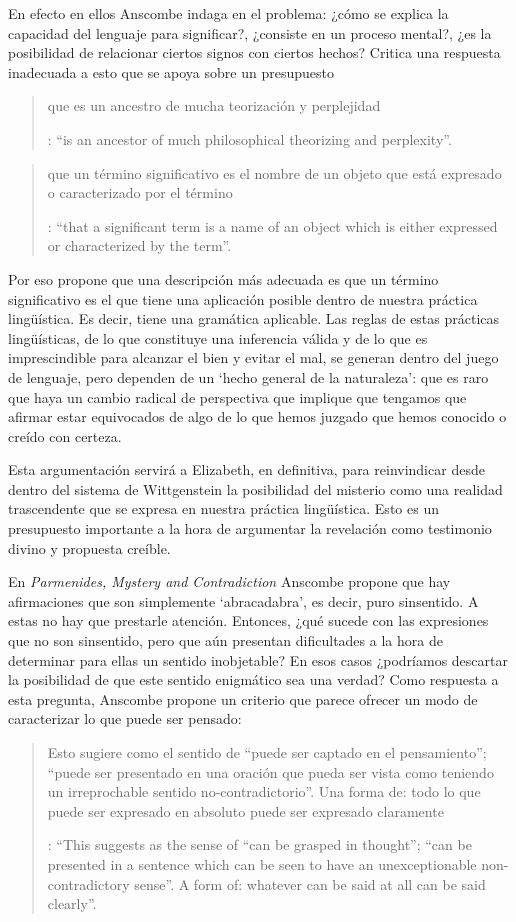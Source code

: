 En efecto en ellos Anscombe indaga en el problema: ¿cómo se explica la capacidad del lenguaje para significar?, ¿consiste en un proceso mental?, ¿es la posibilidad de relacionar ciertos signos con ciertos hechos? Critica una respuesta inadecuada a esto que se apoya sobre un presupuesto \blockquote[{\cite[Introduction, xi]{anscombe1981parmenides}}: \enquote{is an ancestor of much philosophical theorizing and perplexity}.]{que es un ancestro de mucha teorización y perplejidad}: \blockquote[{\cite[Introduction, x]{anscombe1981parmenides}}: \enquote{that a significant term is a name of an object which is either expressed or characterized by the term}.]{que un término significativo es el nombre de un objeto que está expresado o caracterizado por el término}. Por eso propone que una descripción más adecuada es que un término significativo es el que tiene una aplicación posible dentro de nuestra práctica lingüística. Es decir, tiene una gramática aplicable. Las reglas de estas prácticas lingüísticas, de lo que constituye una inferencia válida y de lo que es imprescindible para alcanzar el bien y evitar el mal, se generan dentro del juego de lenguaje, pero dependen de un `hecho general de la naturaleza':  que es raro que haya un cambio radical de perspectiva que implique que tengamos que afirmar estar equivocados de algo de lo que hemos juzgado que hemos conocido o creído con certeza.

Esta argumentación servirá a Elizabeth, en definitiva, para reinvindicar desde dentro del sistema de Wittgenstein la posibilidad del misterio como una realidad trascendente que se expresa en nuestra práctica lingüística. Esto es un presupuesto importante a la hora de argumentar la revelación como testimonio divino y propuesta creíble.

En \emph{Parmenides, Mystery and Contradiction} Anscombe propone que hay afirmaciones que son simplemente `abracadabra', es decir, puro sinsentido. A estas no hay que prestarle atención. Entonces, ¿qué sucede con las expresiones que no son sinsentido, pero que aún presentan dificultades a la hora de determinar para ellas un sentido inobjetable? En esos casos ¿podríamos descartar la posibilidad de que este sentido enigmático sea una verdad? Como respuesta a esta pregunta, Anscombe propone un criterio que parece ofrecer un modo de caracterizar lo que puede ser pensado: \blockquote[{\Cite[8]{anscombe1981parmenides:pmc}}: \enquote{This suggests as the sense of ``can be grasped in thought''; ``can be presented in a sentence which can be seen to have an unexceptionable non-contradictory sense''. A form of: whatever can be said at all can be said clearly}.]{Esto sugiere como el sentido de ``puede ser captado en el pensamiento''; ``puede ser presentado en una oración que pueda ser vista como teniendo un irreprochable sentido no-contradictorio''. Una forma de: todo lo que puede ser expresado en absoluto puede ser expresado claramente}.


